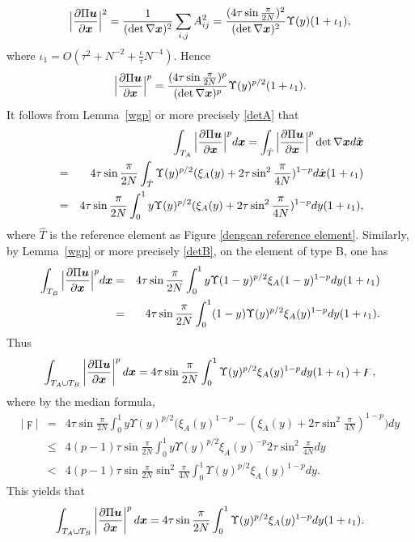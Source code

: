 \documentclass[12pt]{article}
\renewcommand{\vec}[1]{\mbox{\boldmath$#1$}}
\numberwithin{equation}{section}
\begin{document}
$$
\Big|\frac{\partial \Pi \vec{u}}{\partial \vec{x}}\Big|^2=
\frac{1}{(\det \nabla \vec{x})^2}\sum\limits_{i,j}A_{ij}^2
=\frac{(4\tau\sin \frac{\pi}{2N})^2}{(\det \nabla \vec{x})^2}\Upsilon(y)(1+\iota_1),
$$
where $\iota_1=O(\tau^2+N^{-2}+\frac{\epsilon}{\tau}N^{-4})$. Hence
$$
\Big|\frac{\partial \Pi \vec{u}}{\partial \vec{x}}\Big|^p=
\frac{(4\tau
\sin{\frac{\pi}{2N}})^p}{(\det \nabla \vec{x})^p}\Upsilon(y)^{p/2}(1+\iota_1).
$$
It follows from Lemma~\ref{wgp} or more precisely \eqref{detA} that
\begin{eqnarray*}
&&\int_{T_A}\Big|\frac{\partial \Pi \vec{u}}{\partial \vec{x}}\Big|^pd\vec{x}=\int_{\hat{T}}
\Big|\frac{\partial \Pi \vec{u}}{\partial \vec{x}}\Big|^p\det \nabla \vec{x}d\hat{\vec{x}} \\
&=&4\tau\sin{\frac{\pi}{2N}}\int_{\hat{T}} \Upsilon(y)^{p/2}(\xi_A(y)+
2\tau \sin^2\frac{\pi}{4N})^{1-p}
d\hat{\vec{x}}(1+\iota_1)\\
&=&4\tau\sin{\frac{\pi}{2N}}\int_0^1 y\Upsilon(y)^{p/2}(\xi_A(y)+
2\tau \sin^2\frac{\pi}{4N})^{1-p}
dy(1+\iota_1),
\end{eqnarray*}
where $\hat{T}$ is the reference element as Figure \ref{dengcan reference element}.
Similarly, by Lemma~\ref{wgp} or more precisely \eqref{detB}, on the element of type B,
one has
\begin{eqnarray}
\int_{T_B}\Big|\frac{\partial \Pi \vec{u}}{\partial
\vec{x}}\Big|^pd\vec{x}&=&4\tau\sin{\frac{\pi}{2N}}\int_0^1
y\Upsilon(1-y)^{p/2}\xi_A(1-y)^{1-p}
dy(1+\iota_1)\nonumber\\
&=&4\tau\sin{\frac{\pi}{2N}}\int_0^1 (1-y)\Upsilon(y)^{p/2}\xi_A(y)^{1-p}
dy(1+\iota_1).\label{TBenergy}
\end{eqnarray}
Thus
$$
\int_{T_A\cup T_B}\left| \frac{\partial \Pi \vec{u}}{\partial \vec{x}} \right|^p
d\vec{x}=4\tau \sin{\frac{\pi}{2N}}\int_0^1
\Upsilon(y)^{p/2}\xi_A(y)^{1-p}dy(1+\iota_1) +\digamma,
$$
where by the median formula,
\begin{eqnarray*}
|\digamma|&=&
4\tau \sin{\frac{\pi}{2N}}\int_0^1y\Upsilon(y)^{p/2}\Big(\xi_A(y)^{1-p}-(\xi_A(y)+
2\tau \sin^2\frac{\pi}{4N})^{1-p}\Big)dy\\
&\le &4(p-1)\tau \sin{\frac{\pi}{2N}}\int_0^1y \Upsilon(y)^{p/2}\xi_A(y)^{-p}
2\tau \sin^2\frac{\pi}{4N} dy \\
&< &4(p-1)\tau \sin{\frac{\pi}{2N}}\sin^2\frac{\pi}{4N}\int_0^1
\Upsilon(y)^{p/2}\xi_A(y)^{1-p} dy.
\end{eqnarray*}
This yields that
\begin{equation}
\int_{T_A\cup T_B}\left| \frac{\partial \Pi \vec{u}}{\partial \vec{x}} \right|^p
d\vec{x}=4\tau \sin{\frac{\pi}{2N}}\int_0^1
\Upsilon(y)^{p/2}\xi_A(y)^{1-p}dy(1+\iota_1). \label{TABenergy}
\end{equation}
\end{document}
